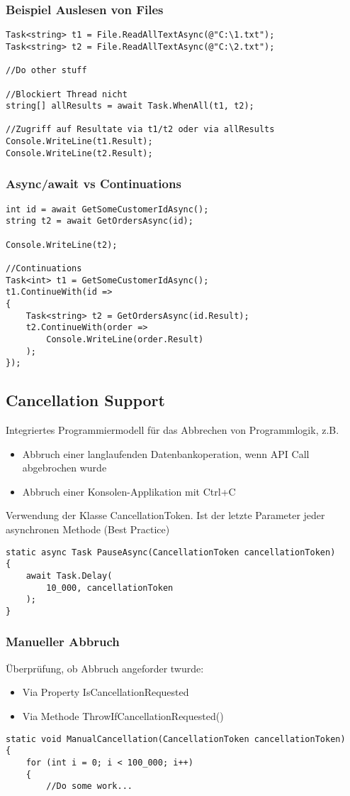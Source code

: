 \begin{multicols*}{2}
\subsubsection{Beispiel Auslesen von Files}
\begin{lstlisting}
Task<string> t1 = File.ReadAllTextAsync(@"C:\1.txt"); 
Task<string> t2 = File.ReadAllTextAsync(@"C:\2.txt");

//Do other stuff 

//Blockiert Thread nicht
string[] allResults = await Task.WhenAll(t1, t2);

//Zugriff auf Resultate via t1/t2 oder via allResults
Console.WriteLine(t1.Result);
Console.WriteLine(t2.Result);
\end{lstlisting}
\subsubsection{Async/await vs Continuations}
\begin{lstlisting}
int id = await GetSomeCustomerIdAsync();
string t2 = await GetOrdersAsync(id); 

Console.WriteLine(t2);  

//Continuations
Task<int> t1 = GetSomeCustomerIdAsync();
t1.ContinueWith(id =>
{
    Task<string> t2 = GetOrdersAsync(id.Result);
    t2.ContinueWith(order =>
        Console.WriteLine(order.Result)
    );
});
\end{lstlisting}

\subsection{Cancellation Support}
Integriertes Programmiermodell für das Abbrechen von Programmlogik, z.B.
\begin{itemize}
    \item Abbruch einer langlaufenden Datenbankoperation, wenn API Call abgebrochen wurde
    \item Abbruch einer Konsolen-Applikation mit Ctrl+C
\end{itemize}
Verwendung der Klasse CancellationToken. Ist der letzte Parameter jeder asynchronen Methode (Best Practice)
\begin{lstlisting}
static async Task PauseAsync(CancellationToken cancellationToken)
{
    await Task.Delay(
        10_000, cancellationToken
    );
}
\end{lstlisting}
\subsubsection{Manueller Abbruch}
Überprüfung, ob Abbruch angeforder twurde:
\begin{itemize}
    \item Via Property IsCancellationRequested
    \item Via Methode ThrowIfCancellationRequested()
\end{itemize}
\begin{lstlisting}
static void ManualCancellation(CancellationToken cancellationToken)
{
    for (int i = 0; i < 100_000; i++) 
    {
        //Do some work...


\end{lstlisting}
\end{multicols*}
